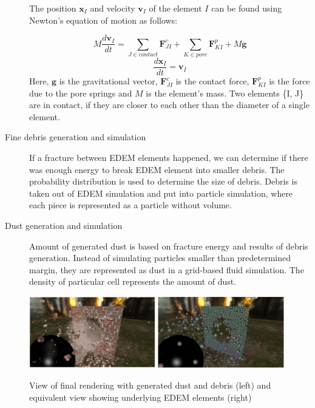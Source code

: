 \begin{description}
The position $\mathbf{x}_I$ and velocity $\mathbf{v}_I$ of the element $\mathit{I}$ can be found using Newton’s equation of motion as follows:
 
\[M\frac{d\mathbf{v}_I}{dt} = \sum_{J \in contact}^{} \mathbf{F}_{JI}^c + \sum_{K \in pore}^{} \mathbf{F}_{KI}^p + M\mathbf{g} \]
\[ \frac{d\mathbf{x}_I}{dt} = \mathbf{v}_I \]
Here, $\mathbf{g}$ is the gravitational vector, $\mathbf{F}^c_{JI}$ is the contact force, $\mathbf{F}^p_{KI}$ is the force due to the pore springs and $\mathit{M}$ is the element’s mass. Two elements \{I, J\} are in contact, if they are closer to each other than the diameter of a single element.

\item[Fine debris generation and simulation] If a fracture between EDEM elements happened, we can determine if there was enough energy to break EDEM element into smaller debris. The probability distribution is used to determine the size of debris. Debris is taken out of EDEM simulation and put into particle simulation, where each piece is represented as a particle without volume.

\item[Dust generation and simulation] Amount of generated dust is based on fracture energy and results of debris generation. Instead of simulating particles smaller than predetermined margin, they are represented as dust in a grid-based fluid simulation. The density of particular cell represents the amount of dust.

\end{description}

 \begin{figure}
        \centering
        \includegraphics[width=0.49\textwidth]{img/edem_real}
        \includegraphics[width=0.49\textwidth]{img/edem}
        \caption{View of final rendering with generated dust and debris (left) and equivalent view showing underlying EDEM elements (right) \cite{edem}}
        \label{fig:edem}
    \end{figure}
   
